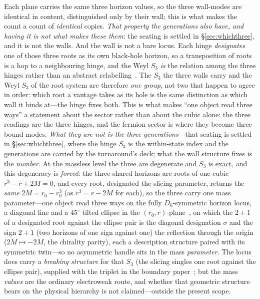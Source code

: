 \documentclass[11pt]{article}
\begin{document}
Each plane carries the same three horizon values, so the three wall-modes are identical in content, distinguished only by their wall; this is what makes the count a count of \emph{identical} copies. \emph{That property the generations also have, and having it is not what makes these them}: the seating is settled in \S\ref{sec:whichthree}, and it is not the walls. And the wall is not a bare locus. Each hinge \emph{designates} one of those three roots as its own black-hole horizon, so a transposition of roots is a hop to a neighbouring hinge, and the Weyl $S_3$ \emph{is} the relation among the three hinges rather than an abstract relabelling~\cite{JanzenSlicing}. The $S_3$ the three walls carry and the Weyl $S_3$ of the root system are therefore \emph{one group}, not two that happen to agree in order: which root a vantage takes as its hole is the same distinction as which wall it binds at---the hinge fixes both. This is what makes ``one object read three ways'' a statement about the sector rather than about the cubic alone: the three readings are the three hinges, and the fermion sector is where they become three bound modes. \emph{What they are not is the three generations}---that seating is settled in \S\ref{sec:whichthree}, where the hinge $S_3$ is the within-state index and the generations are carried by the turnaround's deck; what the wall structure fixes is the \emph{number}. At the massless level the three are degenerate and $S_3$ is exact, and this degeneracy is \emph{forced}: the three shared horizons are roots of one cubic $r^3-r+2M=0$, and every root, designated the slicing parameter, returns the \emph{same} $2M=r_0-r_0^3$ (as $r^3=r-2M$ for each), so the three carry one mass parameter---one object read three ways on the fully $D_6$-symmetric horizon locus, a diagonal line and a $45^\circ$ tilted ellipse in the $(r_0,r)$-plane~\cite{JanzenSlicing}, on which the $2{+}1$ of a designated root against the ellipse pair is the diagonal designation $\sigma$ and the sign $2{+}1$ (two horizons of one sign against one) the reflection through the origin ($2M\mapsto-2M$, the chirality parity), each a description structure paired with its symmetric twin---so no asymmetric handle sits in the mass \emph{parameter}. The locus does carry a \emph{breaking structure} for that $S_3$ (the slicing singles one root against the ellipse pair), supplied with the triplet in the boundary paper~\cite{JanzenBoundary}; but the mass \emph{values} are the ordinary electroweak route, and whether that geometric structure bears on the physical hierarchy is not claimed---outside the present scope.
\end{document}
